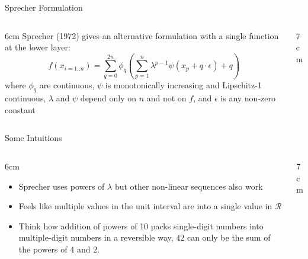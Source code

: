 \begin{frame}{Sprecher Formulation}

\begin{columns}

  \begin{column}{6cm}
  \textcolor{citations}{Sprecher (1972)} gives an alternative formulation with a single function
  at the lower layer:
  $$
  f(x_{i=1..n}) = \sum_{q=0}^{2n}\phi_q\left(\sum_{p=1}^n\lambda^{p-1}\psi(x_p+q\cdot\epsilon)+q\right)
  $$
  where $\phi_q$ are continuous,
  $\psi$ is monotonically increasing and Lipschitz-1 continuous,
  $\lambda$ and $\psi$ depend only on $n$ and not on $f$,
  and $\epsilon$ is any non-zero constant
  \end{column}

  \begin{column}{7cm}
  
  \end{column}

\end{columns}

\end{frame}



\begin{frame}{Some Intuitions}

\begin{columns}

  \begin{column}{6cm}
  \begin{itemize}
  \item Sprecher uses powers of $\lambda$ but other non-linear
    sequences also work
  \item Feels like multiple values in the unit interval are
     into a single value in $\mathcal{R}$
  \item Think how addition of powers of 10 packs single-digit
    numbers into multiple-digit numbers in a reversible way, $42$ can
    only be the sum of the powers of $4$ and $2$.
  \end{itemize}
  \end{column}

  \begin{column}{7cm}
  
  \end{column}

\end{columns}

\end{frame}



